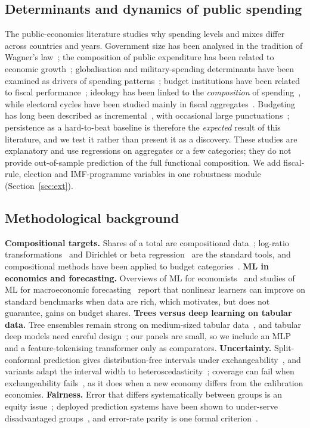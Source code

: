 \subsection{Determinants and dynamics of public spending}
The public-economics literature studies why spending levels and mixes differ across countries and years. Government size has been analysed in the tradition of Wagner's law~\cite{lamartina2011}; the composition of public expenditure has been related to economic growth~\cite{devarajan1996,kneller1999,afonso2010}; globalisation and military-spending determinants have been examined as drivers of spending patterns~\cite{garrett2001,dunne2003}; budget institutions have been related to fiscal performance~\cite{alesina1999}; ideology has been linked to the \emph{composition} of spending~\cite{potrafke2010,bove2017}, while electoral cycles have been studied mainly in fiscal aggregates~\cite{nordhaus1975,rogoff1988,brender2005}. Budgeting has long been described as incremental~\cite{davis1966}, with occasional large punctuations~\cite{jones2005}; persistence as a hard-to-beat baseline is therefore the \emph{expected} result of this literature, and we test it rather than present it as a discovery. These studies are explanatory and use regressions on aggregates or a few categories; they do not provide out-of-sample prediction of the full functional composition. We add fiscal-rule, election and IMF-programme variables in one robustness module (Section~\ref{sec:ext}).

\subsection{Methodological background}
\textbf{Compositional targets.} Shares of a total are compositional data~\cite{aitchison1986}; log-ratio transformations~\cite{egozcue2003} and Dirichlet or beta regression~\cite{ferrari2004,douma2019} are the standard tools, and compositional methods have been applied to budget categories~\cite{adolph2020}. \textbf{ML in economics and forecasting.} Overviews of ML for economists~\cite{athey2019,mullainathan2017} and studies of ML for macroeconomic forecasting~\cite{medeiros2021,goulet2022} report that nonlinear learners can improve on standard benchmarks when data are rich, which motivates, but does not guarantee, gains on budget shares. \textbf{Trees versus deep learning on tabular data.} Tree ensembles remain strong on medium-sized tabular data~\cite{grinsztajn2022,shwartzziv2022,borisov2024}, and tabular deep models need careful design~\cite{gorishniy2021}; our panels are small, so we include an MLP and a feature-tokenising transformer only as comparators. \textbf{Uncertainty.} Split-conformal prediction gives distribution-free intervals under exchangeability~\cite{lei2018,angelopoulos2023}, and variants adapt the interval width to heteroscedasticity~\cite{romano2019}; coverage can fail when exchangeability fails~\cite{barber2023}, as it does when a new economy differs from the calibration economies. \textbf{Fairness.} Error that differs systematically between groups is an equity issue~\cite{mehrabi2021}; deployed prediction systems have been shown to under-serve disadvantaged groups~\cite{obermeyer2019}, and error-rate parity is one formal criterion~\cite{hardt2016}.

